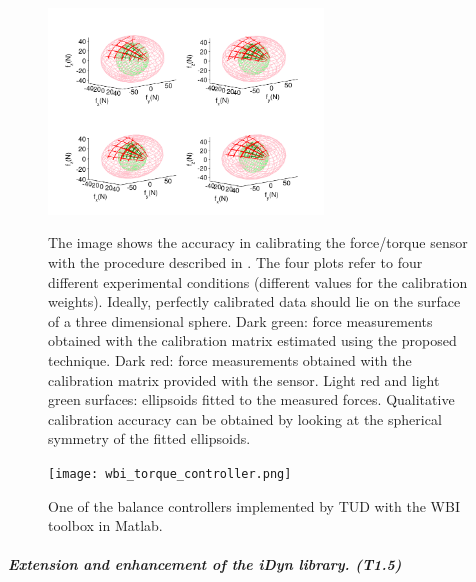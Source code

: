 \begin{figure}[h]
\vspace{0.5em}
\centering
{\includegraphics[width=0.65\textwidth]{images/leg_validation.pdf}}
\caption{The image shows the accuracy in calibrating the force/torque sensor
  with the procedure described in \cite{Traversaro2015b}. The four plots refer
  to four different experimental conditions (different values for the
  calibration weights).  Ideally, perfectly calibrated data should lie on the
  surface of a three dimensional sphere. Dark green: force measurements
  obtained with the calibration matrix estimated using the proposed
  technique. Dark red: force measurements obtained with the calibration matrix
  provided with the sensor.  Light red and light green surfaces: ellipsoids
  fitted to the measured forces.  Qualitative calibration accuracy can be
  obtained by looking at the spherical symmetry of the fitted ellipsoids.}
\label{fig:validation}
\end{figure}

 \begin{figure}
 \centering
 \texttt{[image: wbi\_torque\_controller.png]}
  \caption{One of the balance controllers implemented by TUD with the WBI
    toolbox in Matlab.  }
 \label{fig:wbitud}
 \end{figure}


\subparagraph{Extension and enhancement of the iDyn library. (T1.5)}
\label{sec:T15}
 
